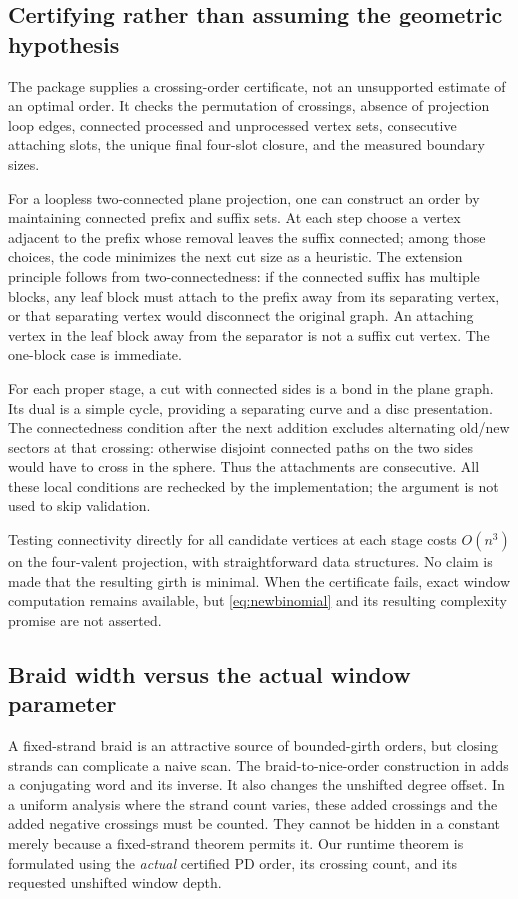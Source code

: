 \documentclass[11pt]{article}
\theoremstyle{definition}\newtheorem{definition}[theorem]{Definition}
\theoremstyle{remark}\newtheorem{remark}[theorem]{Remark}
\begin{document}
\subsection{Certifying rather than assuming the geometric hypothesis}
The package supplies a crossing-order certificate, not an unsupported estimate of an optimal order. It checks the permutation of crossings, absence of projection loop edges, connected processed and unprocessed vertex sets, consecutive attaching slots, the unique final four-slot closure, and the measured boundary sizes.

For a loopless two-connected plane projection, one can construct an order by maintaining connected prefix and suffix sets. At each step choose a vertex adjacent to the prefix whose removal leaves the suffix connected; among those choices, the code minimizes the next cut size as a heuristic. The extension principle follows from two-connectedness: if the connected suffix has multiple blocks, any leaf block must attach to the prefix away from its separating vertex, or that separating vertex would disconnect the original graph. An attaching vertex in the leaf block away from the separator is not a suffix cut vertex. The one-block case is immediate.

For each proper stage, a cut with connected sides is a bond in the plane graph. Its dual is a simple cycle, providing a separating curve and a disc presentation. The connectedness condition after the next addition excludes alternating old/new sectors at that crossing: otherwise disjoint connected paths on the two sides would have to cross in the sphere. Thus the attachments are consecutive. All these local conditions are rechecked by the implementation; the argument is not used to skip validation.

Testing connectivity directly for all candidate vertices at each stage costs $O(n^3)$ on the four-valent projection, with straightforward data structures. No claim is made that the resulting girth is minimal. When the certificate fails, exact window computation remains available, but \eqref{eq:newbinomial} and its resulting complexity promise are not asserted.

\subsection{Braid width versus the actual window parameter}
A fixed-strand braid is an attractive source of bounded-girth orders, but closing strands can complicate a naive scan. The braid-to-nice-order construction in \cite[Section 5.1]{KS} adds a conjugating word and its inverse. It also changes the unshifted degree offset. In a uniform analysis where the strand count varies, these added crossings and the added negative crossings must be counted. They cannot be hidden in a constant merely because a fixed-strand theorem permits it. Our runtime theorem is formulated using the \emph{actual} certified PD order, its crossing count, and its requested unshifted window depth.
\end{document}
